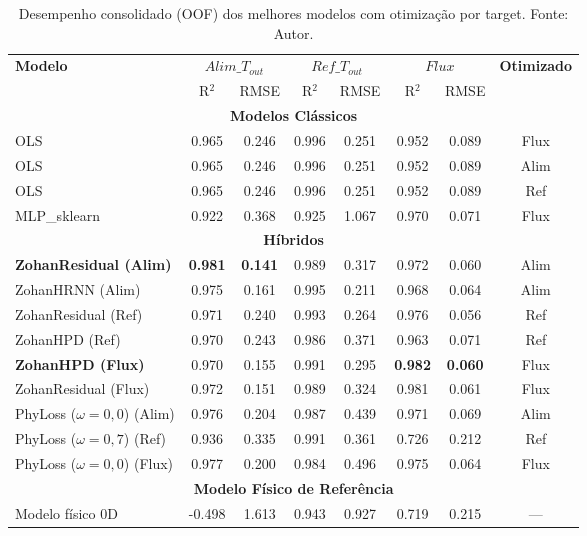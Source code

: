\begin{table}[H]
\centering
\caption[Desempenho OOF consolidado]{Desempenho consolidado (OOF) dos melhores modelos com otimização por target. Fonte: Autor.}
\label{tab:oof_all}
\begin{tabular}{l c c c c c c c}
\hline
\textbf{Modelo} &
\multicolumn{2}{c}{\textbf{$Alim\_T_{out}$}} &
\multicolumn{2}{c}{\textbf{$Ref\_T_{out}$}} &
\multicolumn{2}{c}{\textbf{$Flux$}} &
\textbf{Otimizado} \\
\cline{2-3} \cline{4-5} \cline{6-7}
 & R$^2$ & RMSE & R$^2$ & RMSE & R$^2$ & RMSE & \\
\hline
\multicolumn{8}{c}{\textbf{Modelos Clássicos}} \\
\hline
OLS & 0.965 & 0.246 & 0.996 & 0.251 & 0.952 & 0.089 & Flux \\
OLS & 0.965 & 0.246 & 0.996 & 0.251 & 0.952 & 0.089 & Alim \\
OLS & 0.965 & 0.246 & 0.996 & 0.251 & 0.952 & 0.089 & Ref \\
MLP\_sklearn & 0.922 & 0.368 & 0.925 & 1.067 & 0.970 & 0.071 & Flux \\
\hline
\multicolumn{8}{c}{\textbf{Híbridos}} \\
\hline
\rowcolor{orange!15}
\textbf{ZohanResidual (Alim)} & \textbf{0.981} & \textbf{0.141} & 0.989 & 0.317 & 0.972 & 0.060 & Alim \\
ZohanHRNN (Alim) & 0.975 & 0.161 & 0.995 & 0.211 & 0.968 & 0.064 & Alim \\
ZohanResidual (Ref) & 0.971 & 0.240 & 0.993 & 0.264 & 0.976 & 0.056 & Ref \\
ZohanHPD (Ref) & 0.970 & 0.243 & 0.986 & 0.371 & 0.963 & 0.071 & Ref \\
\rowcolor{green!15}
\textbf{ZohanHPD (Flux)} & 0.970 & 0.155 & 0.991 & 0.295 & \textbf{0.982} & \textbf{0.060} & Flux \\
ZohanResidual (Flux) & 0.972 & 0.151 & 0.989 & 0.324 & 0.981 & 0.061 & Flux \\
PhyLoss ($\omega{=}0{,}0$) (Alim) & 0.976 & 0.204 & 0.987 & 0.439 & 0.971 & 0.069 & Alim \\
PhyLoss ($\omega{=}0{,}7$) (Ref) & 0.936 & 0.335 & 0.991 & 0.361 & 0.726 & 0.212 & Ref \\
PhyLoss ($\omega{=}0{,}0$) (Flux) & 0.977 & 0.200 & 0.984 & 0.496 & 0.975 & 0.064 & Flux \\
\hline
\multicolumn{8}{c}{\textbf{Modelo Físico de Referência}} \\
\hline
Modelo físico 0D & -0.498 & 1.613 & 0.943 & 0.927 & 0.719 & 0.215 & --- \\
\hline
\end{tabular}
\end{table}